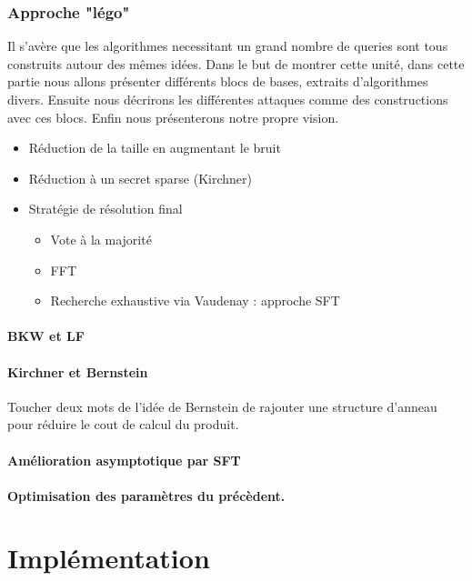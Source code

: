 \documentclass{article}		%
\begin{document}
\subsubsection{Approche "légo"}
Il s'avère que les algorithmes  necessitant un grand nombre
de queries sont tous construits autour des mêmes idées. Dans le but de
montrer cette unité, dans cette partie nous allons présenter différents
blocs de bases, extraits d'algorithmes divers. Ensuite nous décrirons les
différentes attaques comme des constructions avec ces blocs. Enfin nous
présenterons notre propre vision.  
\begin{itemize}
\item Réduction de la taille en augmentant le bruit
\item Réduction à un secret sparse (Kirchner)
\item Stratégie de résolution final
\begin{itemize}
\item Vote à la majorité
\item FFT
\item Recherche exhaustive via Vaudenay : approche SFT \cite{Akavia} \label{SFT}
\end{itemize} 
\end{itemize}

\paragraph{BKW et LF}
\cite{BKW}
\cite{LF}

\paragraph{Kirchner et Bernstein}
\cite{Bernstein}
\cite{Kirchner} Toucher deux mots de l'idée de Bernstein de rajouter une structure
d'anneau pour réduire le cout de calcul du produit.

\paragraph{Amélioration asymptotique par SFT}

\paragraph{Optimisation des paramètres du précèdent.}


\section{Implémentation}
\end{document}
